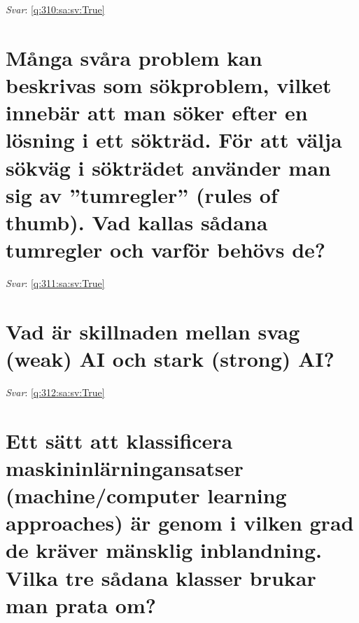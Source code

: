 \documentclass[a4paper,11pt,oneside]{book}
\begin{document}
\begin{sloppypar}
\label{q:310:sa:sv:False}

\vspace{2cm}

\noindent\makebox[\textwidth]{\hrulefill}

\vspace{1cm}

\textit{Svar}: \autoref{q:310:sa:sv:True}



\section{M\r{a}nga sv\r{a}ra problem kan beskrivas som s\"okproblem, vilket inneb\"ar att man s\"oker efter en l\"osning i ett s\"oktr\"ad. F\"or att v\"alja s\"okv\"ag i s\"oktr\"adet anv\"ander man sig av {\textquotedblright}tumregler{\textquotedblright} (rules of thumb). Vad kallas s\r{a}dana tumregler och varf\"or beh\"ovs de?}

\label{q:311:sa:sv:False}

\vspace{2cm}

\noindent\makebox[\textwidth]{\hrulefill}

\vspace{1cm}

\textit{Svar}: \autoref{q:311:sa:sv:True}



\section{Vad \"ar skillnaden mellan svag (weak) AI och stark (strong) AI?}

\label{q:312:sa:sv:False}

\vspace{2cm}

\noindent\makebox[\textwidth]{\hrulefill}

\vspace{1cm}

\textit{Svar}: \autoref{q:312:sa:sv:True}



\section{Ett s\"att att klassificera maskininl\"arningansatser (machine/computer learning approaches) \"ar genom i vilken grad de kr\"aver m\"ansklig inblandning. Vilka tre s\r{a}dana klasser brukar man prata om?}


\end{sloppypar}
\end{document}
